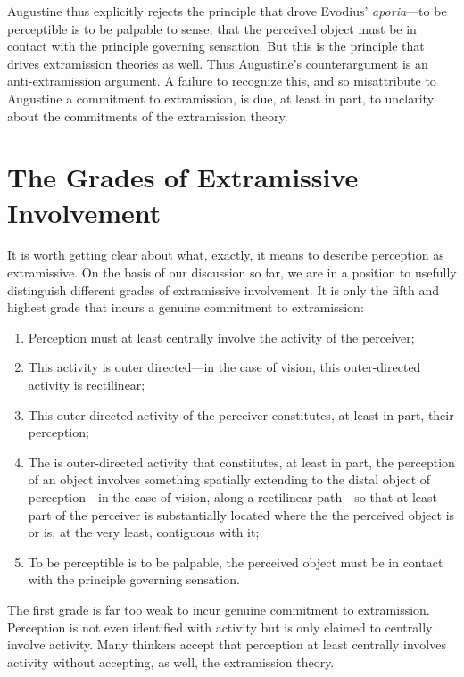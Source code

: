 \documentclass[12pt]{article}
\begin{document}
Augustine thus explicitly rejects the principle that drove Evodius' \emph{aporia}---to be perceptible is to be palpable to sense, that the perceived object must be in contact with the principle governing sensation. But this is the principle that drives extramission theories as well. Thus Augustine's counterargument is an anti-extramis\-sion argument. A failure to recognize this, and so misattribute to Augustine a commitment to extramission, is due, at least in part, to unclarity about the commitments of the extramission theory.


\section{The Grades of Extramissive Involvement} %
\label{sec:extramission}

It is worth getting clear about what, exactly, it means to describe perception as extramissive. On the basis of our discussion so far, we are in a position to usefully distinguish different grades of extramissive involvement. It is only the fifth and highest grade that incurs a genuine commitment to extramission:
\begin{enumerate}
	\item Perception must at least centrally involve the activity of the perceiver;
	\item This activity is outer directed---in the case of vision, this outer-directed activity is rectilinear;
	\item This outer-directed activity of the perceiver constitutes, at least in part, their perception;
	\item The is outer-directed activity that constitutes, at least in part, the perception of an object involves something spatially extending to the distal object of perception---in the case of vision, along a rectilinear path---so that at least part of the perceiver is substantially located where the the perceived object is or is, at the very least, contiguous with it;
	\item To be perceptible is to be palpable, the perceived object must be in contact with the principle governing sensation.
\end{enumerate}

The first grade is far too weak to incur genuine commitment to extramission. Perception is not even identified with activity but is only claimed to centrally involve activity. Many thinkers accept that perception at least centrally involves activity without accepting, as well, the extramission theory. 
\end{document}
